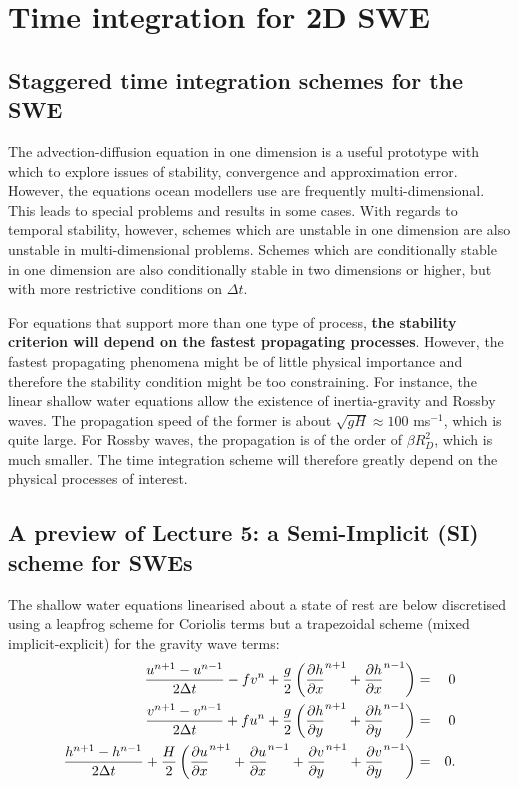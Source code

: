 \clearpage

\section{Time integration for 2D SWE}
\subsection{Staggered time integration schemes for the SWE}

The advection-diffusion equation in one dimension is a useful prototype with which to explore issues of stability, convergence and approximation error. However, the equations ocean modellers use are frequently multi-dimensional. This leads to special problems and results in some cases. With regards to temporal stability, however, schemes which are unstable in one dimension are also unstable in multi-dimensional problems. Schemes which are conditionally stable in one dimension are also conditionally stable in two dimensions or higher, but with more restrictive conditions on $\Delta t$.

\vspace{0.2cm}For equations that support more than one type of process, {\bf the stability criterion will depend on the fastest propagating processes}. However, the fastest propagating phenomena might be of little physical importance and therefore the stability condition might be too constraining. For instance, the linear shallow water equations allow the existence of inertia-gravity and Rossby waves. The propagation speed of the former is about $\sqrt{gH} \approx 100 $ ms$^{-1}$, which is quite large. For Rossby waves, the propagation is of the order of $\beta R_D^2$, which is much smaller. The time integration scheme will therefore greatly depend on the physical processes of interest. 

\subsection{A preview of Lecture 5: a Semi-Implicit (SI) scheme for SWEs}

The shallow water equations linearised about a state of rest are below
discretised using a leapfrog scheme for Coriolis terms but a
trapezoidal scheme (mixed implicit-explicit) for the gravity wave
terms:
\begin{eqnarray*}
	\frac{u^{n+1}-u^{n-1}}{2\Delta t}-fv^n+\frac{g}{2}
	\left( \frac{\partial h}{\partial x}^{n+1} +\frac{\partial h}{\partial x}^{n-1} \right) & = & 0 \\
	\frac{v^{n+1}-v^{n-1}}{2\Delta t}+fu^n+\frac{g}{2}
	\left( \frac{\partial h}{\partial y}^{n+1} +\frac{\partial h}{\partial y}^{n-1} \right) & = & 0 \\
	\frac{h^{n+1}-h^{n-1}}{2\Delta t}+\frac{H}{2}
	\left( \frac{\partial u}{\partial x}^{n+1} +\frac{\partial u}{\partial x}^{n-1}
	+\frac{\partial v}{\partial y}^{n+1} +\frac{\partial v}{\partial y}^{n-1} 
	\right) & = & 0. 
\end{eqnarray*}

